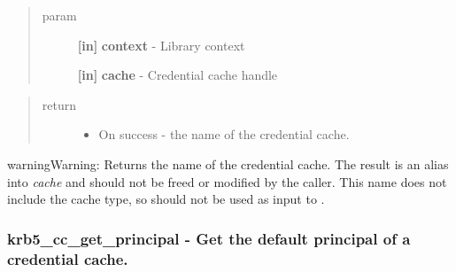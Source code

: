 \documentclass[letterpaper,10pt,english]{sphinxmanual}
\begin{document}
\begin{quote}\begin{description}
\item[{param}] \leavevmode
\textbf{{[}in{]}} \textbf{context} - Library context

\textbf{{[}in{]}} \textbf{cache} - Credential cache handle

\end{description}\end{quote}
\begin{quote}\begin{description}
\item[{return}] \leavevmode\begin{itemize}
\item {} 
On success - the name of the credential cache.

\end{itemize}

\end{description}\end{quote}

\begin{notice}{warning}{Warning:}
Returns the name of the credential cache. The result is an alias into \emph{cache} and should not be freed or modified by the caller. This name does not include the cache type, so should not be used as input to {\hyperref[appdev/refs/api/krb5_cc_resolve:krb5_cc_resolve]{}} .
\end{notice}


\subsubsection{krb5\_cc\_get\_principal -  Get the default principal of a credential cache.}
\label{appdev/refs/api/krb5_cc_get_principal:krb5-cc-get-principal-get-the-default-principal-of-a-credential-cache}\label{appdev/refs/api/krb5_cc_get_principal::doc}

\begin{fulllineitems}
\label{appdev/refs/api/krb5_cc_get_principal:krb5_cc_get_principal}
\end{fulllineitems}
\end{document}
